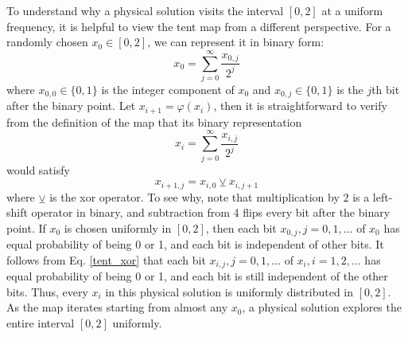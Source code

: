 To understand why a physical solution visits the interval $[0,2]$ at a uniform
frequency, it is helpful to view the tent map from a different perspective.
For a randomly chosen $x_0\in[0,2]$, we can represent it in binary form:
\begin{equation}
    x_0 = \sum_{j=0}^{\infty} \frac{x_{0,j}}{2^j}
\end{equation}
where $x_{0,0}\in\{0,1\}$ is the integer component of $x_0$ and $x_{0,j}\in\{0,1\}$ is the $j$th bit after the binary point.
Let $x_{i+1} = \varphi(x_i)$, then it is straightforward to verify from the definition
of the map that its binary representation
\begin{equation}
    x_i = \sum_{j=0}^{\infty} \frac{x_{i,j}}{2^j}
\end{equation}
would satisfy
\begin{equation} \label{tent_xor}
    x_{i+1,j} = x_{i,0} \veebar x_{i,j+1}
\end{equation}
where $\veebar$ is the xor operator. To see why, note that 
multiplication by 2 is a left-shift operator in binary, and 
subtraction from 4 flips every bit after the binary point. If $x_0$ is chosen uniformly in $[0,2]$, then each bit $x_{0,j},j=0,1,\ldots$ of $x_0$
has equal probability of being 0 or 1, and each bit is independent of other bits.
It follows from Eq. \ref{tent_xor} that each bit $x_{i,j},j=0,1,\ldots$ of $x_i,
i=1,2,\ldots$ has equal probability of being 0 or 1,
and each bit is still independent of the other bits.
Thus, every $x_i$ in this physical solution is uniformly distributed in $[0,2]$.
As the map iterates starting from almost any $x_0$, a physical solution explores the entire interval $[0,2]$ uniformly.

